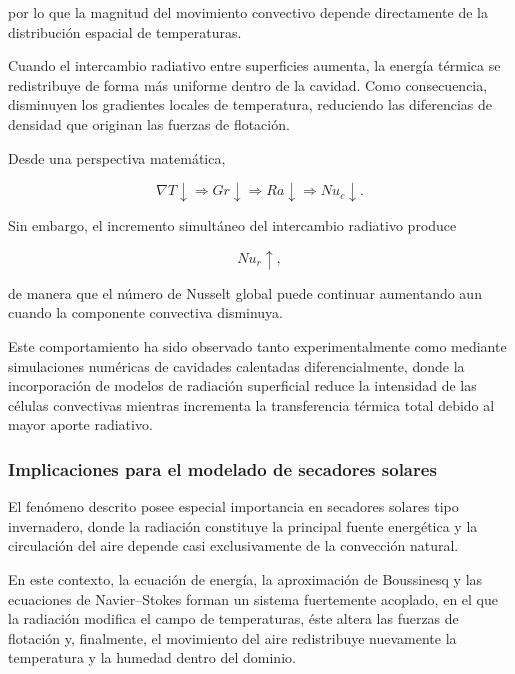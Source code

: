 por lo que la magnitud del movimiento convectivo depende directamente de la distribución espacial de temperaturas.

Cuando el intercambio radiativo entre superficies aumenta, la energía térmica se redistribuye de forma más uniforme dentro de la cavidad. Como consecuencia, disminuyen los gradientes locales de temperatura, reduciendo las diferencias de densidad que originan las fuerzas de flotación.

Desde una perspectiva matemática,

\begin{equation}
\nabla T
\downarrow
\Longrightarrow
Gr
\downarrow
\Longrightarrow
Ra
\downarrow
\Longrightarrow
Nu_c
\downarrow.
\end{equation}

Sin embargo, el incremento simultáneo del intercambio radiativo produce

\begin{equation}
Nu_r\uparrow,
\end{equation}

de manera que el número de Nusselt global puede continuar aumentando aun cuando la componente convectiva disminuya.

Este comportamiento ha sido observado tanto experimentalmente como mediante simulaciones numéricas de cavidades calentadas diferencialmente, donde la incorporación de modelos de radiación superficial reduce la intensidad de las células convectivas mientras incrementa la transferencia térmica total debido al mayor aporte radiativo. 


\subsubsection{Implicaciones para el modelado de secadores solares}

El fenómeno descrito posee especial importancia en secadores solares tipo invernadero, donde la radiación constituye la principal fuente energética y la circulación del aire depende casi exclusivamente de la convección natural.

En este contexto, la ecuación de energía, la aproximación de Boussinesq y las ecuaciones de Navier--Stokes forman un sistema fuertemente acoplado, en el que la radiación modifica el campo de temperaturas, éste altera las fuerzas de flotación y, finalmente, el movimiento del aire redistribuye nuevamente la temperatura y la humedad dentro del dominio.

